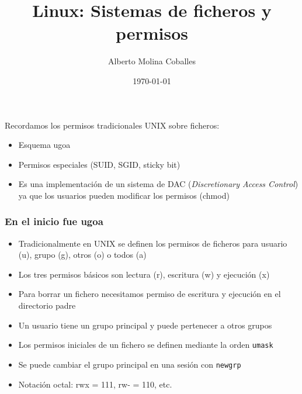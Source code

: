 \documentclass[aspectratio=169]{beamer}
\author{Alberto Molina Coballes}
\title{Linux: Sistemas de ficheros y permisos}
\institute{IES Gonzalo Nazareno}
\date{\today}
\begin{document}
\def\braces#1{[#1]}

\begin{frame}[t,plain]
\titlepage
\end{frame}

\begin{frame}
  Recordamos los permisos tradicionales UNIX sobre ficheros:
  \begin{itemize}
  \item Esquema ugoa
  \item Permisos especiales (SUID, SGID, sticky bit)
  \item Es una implementación de un sistema de DAC (\textit{Discretionary
      Access Control}) ya que los usuarios pueden modificar los
    permisos (chmod)
  \end{itemize}
\end{frame}

\begin{frame}
  \frametitle{En el inicio fue ugoa}
  \begin{itemize}
  \item Tradicionalmente en UNIX se definen los permisos de ficheros
    para usuario (u), grupo (g), otros (o) o todos (a) 
  \item Los tres permisos básicos son lectura (r), escritura (w) y
    ejecución (x) 
  \item Para borrar un fichero necesitamos permiso de escritura y
    ejecución en el directorio padre 
  \item Un usuario tiene un grupo principal y puede pertenecer a otros
    grupos 
  \item Los permisos iniciales de un fichero se definen mediante la
    orden \texttt{umask} 
  \item Se puede cambiar el grupo principal en una sesión con
    \texttt{newgrp} 
  \item Notación octal: rwx = 111, rw- = 110, etc.
  \end{itemize}
\end{frame}
\end{document}
